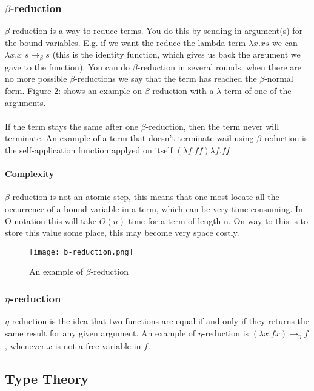 \subsubsection{$\beta$-reduction}
$\beta$-reduction is a way to reduce terms. You do this by sending in argument(s) for the bound variables. E.g. if we want the reduce the lambda term $\lambda x. x s$ we can $\lambda x. x$  $s \rightarrow _\beta s$ (this is the identity function, which gives us back the argument we gave to the function). You can do $\beta$-reduction in several rounds, when there are no more possible $\beta$-reductions we say that the term has reached the $\beta$-normal form. Figure 2:  shows an example on $\beta$-reduction with a $\lambda$-term of one of the arguments. \\ \\
If the term stays the same after one $\beta$-reduction, then the term never will terminate. An example of a term that doesn't terminate wail using $\beta$-reduction is the self-application function applyed on itself $(\lambda f.ff) \lambda f.ff$

\paragraph{Complexity}
$\beta$-reduction is not an atomic step, this means that one most locate all the occurrence of a bound variable in a term, which can be very time consuming. In O-notation this will take $O(n)$ time for a term of length n. On way to this is to store this value some place, this may become very space costly. 

\begin{figure}
    \centering
    \texttt{[image: b-reduction.png]}
    \caption{An example of $\beta$-reduction}
    \label{fig:beta-reduction}
\end{figure}

\subsubsection{$\eta$-reduction}
$\eta$-reduction is the idea that two functions are equal if and only if they returns the same result for 
any given argument. An example of $\eta$-reduction is $(\lambda x.f x)  \rightarrow_\eta f$, whenever $x$ is not 
a free variable in $f$.

\subsection{Type Theory}
\label{Type Theory}


